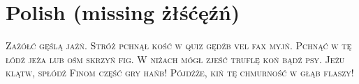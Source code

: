 

\presection\section*{\checkno Polish (missing żłśćęźń)}\postsection

\noindent\textsc{Zażółć gęślą jaźń. Stróż pchnął kość w quiz gędźb vel fax myjń. 
Pchnąć w tę łódź jeża lub ośm skrzyń fig.
W niżach mógł zjeść truflę koń bądź psy.
Jeżu klątw, spłódź Finom część gry hańb!
Pójdźże, kiń tę chmurność w głąb flaszy!}